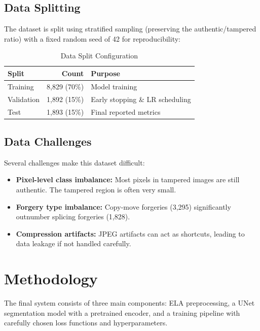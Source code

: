 \documentclass[conference]{IEEEtran}
\begin{document}
\subsection{Data Splitting}

The dataset is split using stratified sampling (preserving the authentic/tampered ratio) with a fixed random seed of 42 for reproducibility:

\begin{table}[H]
\centering
\caption{Data Split Configuration}
\label{tab:split}
\begin{tabular}{l r l}
\toprule
\textbf{Split} & \textbf{Count} & \textbf{Purpose} \\
\midrule
Training & 8,829 (70\%) & Model training \\
Validation & 1,892 (15\%) & Early stopping \& LR scheduling \\
Test & 1,893 (15\%) & Final reported metrics \\
\bottomrule
\end{tabular}
\end{table}

\subsection{Data Challenges}

Several challenges make this dataset difficult:
\begin{itemize}
    \item \textbf{Pixel-level class imbalance:} Most pixels in tampered images are still authentic. The tampered region is often very small.
    \item \textbf{Forgery type imbalance:} Copy-move forgeries (3,295) significantly outnumber splicing forgeries (1,828).
    \item \textbf{Compression artifacts:} JPEG artifacts can act as shortcuts, leading to data leakage if not handled carefully.
\end{itemize}


\section{Methodology}

The final system consists of three main components: ELA preprocessing, a UNet segmentation model with a pretrained encoder, and a training pipeline with carefully chosen loss functions and hyperparameters.
\end{document}
